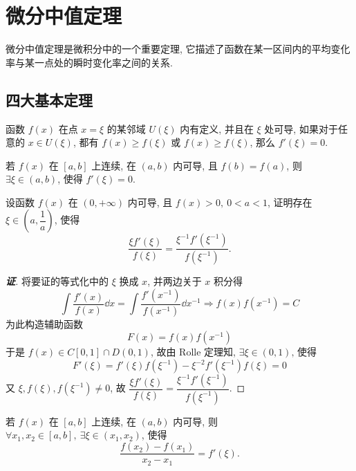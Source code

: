\section{微分中值定理}

微分中值定理是微积分中的一个重要定理, 它描述了函数在某一区间内的平均变化率与某一点处的瞬时变化率之间的关系. 

\subsection{四大基本定理}

\begin{lemma}[Fermat 引理]
    函数 $f(x)$ 在点 $x=\xi$ 的某邻域 $U(\xi)$ 内有定义, 并且在 $\xi$ 处可导, 如果对于任意的 $x\in U(\xi)$, 
    都有 $f(x)\geqslant f(\xi)$ 或 $f(x)\geqslant f(\xi)$, 那么 $f'(\xi)=0.$
\end{lemma}

\begin{theorem}[Rolle 定理]
    若 $f(x)$ 在 $[a,b]$ 上连续, 在 $(a,b)$ 内可导, 且 $f(b)=f(a)$, 则 $\exists\xi\in(a,b)$, 使得 $f'(\xi)=0.$
\end{theorem}

\begin{example}
    设函数 $f(x)$ 在 $(0,+\infty)$ 内可导, 且 $f(x)>0,~0<a<1$, 证明存在 $\xi\in\left(a,\dfrac{1}{a}\right)$, 
    使得 $$\dfrac{\xi f'(\xi)}{f(\xi)}=\dfrac{\xi^{-1}f'(\xi^{-1})}{f(\xi^{-1})}.$$
\end{example}
\begin{proof}[{\songti \textbf{证}}]
    将要证的等式化中的 $\xi$ 换成 $x$, 并两边关于 $x$ 积分得
    $$\int\dfrac{f'(x)}{f(x)}\dd x=\int\dfrac{f'(x^{-1})}{f(x^{-1})}\dd x^{-1}\Rightarrow f(x)f(x^{-1})=C$$
    为此构造辅助函数 $$F(x)=f(x)f(x^{-1})$$
    于是 $f(x)\in C[0,1]\cap D(0,1)$, 故由 Rolle 定理知, $\exists\xi\in(0,1)\text{, 使得 }$
    $$F'(\xi)=f'(\xi)f(\xi^{-1})-\xi^{-2}f'(\xi^{-1})f(\xi)=0$$
    又 $\xi,f(\xi),f(\xi^{-1})\neq0$, 故 $\dfrac{\xi f'(\xi)}{f(\xi)}=\dfrac{\xi^{-1}f'(\xi^{-1})}{f(\xi^{-1})}.$
\end{proof}

\begin{theorem}[Lagrange 定理]
    若 $f(x)$ 在 $[a,b]$ 上连续, 在 $(a,b)$ 内可导, 则 $\forall x_1,x_2\in[a,b],~\exists\xi\in(x_1,x_2)$, 使得
    $$\dfrac{f(x_2)-f(x_1)}{x_2-x_1}=f'(\xi).$$
\end{theorem}

